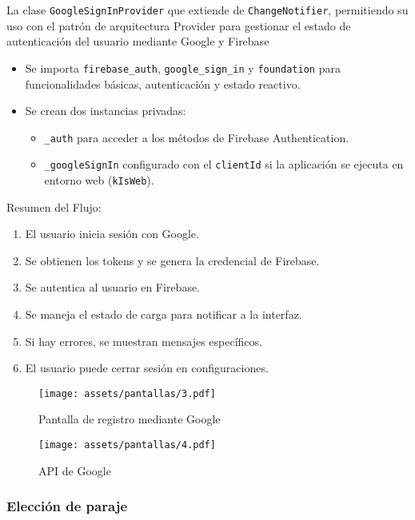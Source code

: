 La clase \texttt{GoogleSignInProvider} que extiende de \texttt{ChangeNotifier}, permitiendo su uso con el patrón de arquitectura Provider para gestionar el estado de autenticación del usuario mediante Google y Firebase

\begin{itemize}
    \item Se importa \texttt{firebase\_auth}, \texttt{google\_sign\_in} y \texttt{foundation} para funcionalidades básicas, autenticación y estado reactivo.
    \item Se crean dos instancias privadas:
    \begin{itemize}
        \item \texttt{\_auth} para acceder a los métodos de Firebase Authentication.
        \item \texttt{\_googleSignIn} configurado con el \texttt{clientId} si la aplicación se ejecuta en entorno web (\texttt{kIsWeb}).
    \end{itemize}
\end{itemize}


Resumen del Flujo:

\begin{enumerate}
    \item El usuario inicia sesión con Google.
    \item Se obtienen los tokens y se genera la credencial de Firebase.
    \item Se autentica al usuario en Firebase.
    \item Se maneja el estado de carga para notificar a la interfaz.
    \item Si hay errores, se muestran mensajes específicos.
    \item El usuario puede cerrar sesión en configuraciones.
\end{enumerate}


\begin{figure}[h!]
\centering
  \texttt{[image: assets/pantallas/3.pdf]}
  \caption{Pantalla de registro mediante Google}
  \label{pantallas2}
\end{figure}

\begin{figure}[h!]
\centering
  \texttt{[image: assets/pantallas/4.pdf]}
  \caption{API de Google}
  \label{pantallas4}
\end{figure}


\newpage
\subsubsection*{Elección de paraje}


